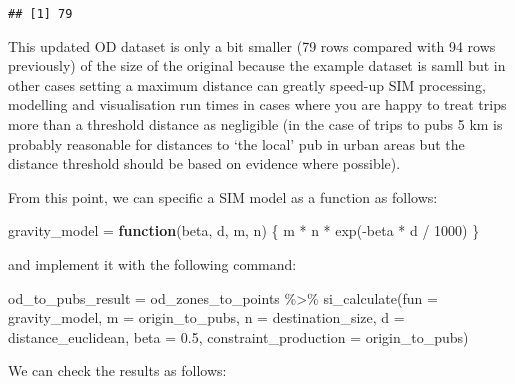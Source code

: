 \documentclass[11pt,letterpaper]{article}
\newenvironment{Shaded}{\begin{snugshade}}{\end{snugshade}}
\newcommand{\AttributeTok}[1]{\textcolor[rgb]{0.77,0.63,0.00}{#1}}
\newcommand{\ControlFlowTok}[1]{\textcolor[rgb]{0.13,0.29,0.53}{\textbf{#1}}}
\newcommand{\DecValTok}[1]{\textcolor[rgb]{0.00,0.00,0.81}{#1}}
\newcommand{\FloatTok}[1]{\textcolor[rgb]{0.00,0.00,0.81}{#1}}
\newcommand{\FunctionTok}[1]{\textcolor[rgb]{0.00,0.00,0.00}{#1}}
\newcommand{\NormalTok}[1]{#1}
\newcommand{\OtherTok}[1]{\textcolor[rgb]{0.56,0.35,0.01}{#1}}
\newcommand{\SpecialCharTok}[1]{\textcolor[rgb]{0.00,0.00,0.00}{#1}}
\begin{document}
\begin{verbatim}
## [1] 79
\end{verbatim}

This updated OD dataset is only a bit smaller (79 rows compared with 94 rows previously) of the size of the original because the example dataset is samll but in other cases setting a maximum distance can greatly speed-up SIM processing, modelling and visualisation run times in cases where you are happy to treat trips more than a threshold distance as negligible (in the case of trips to pubs 5 km is probably reasonable for distances to `the local' pub in urban areas but the distance threshold should be based on evidence where possible).

From this point, we can specific a SIM model as a function as follows:

\begin{Shaded}
\begin{Highlighting}[]
\NormalTok{gravity\_model }\OtherTok{=} \ControlFlowTok{function}\NormalTok{(beta, d, m, n) \{}
\NormalTok{  m }\SpecialCharTok{*}\NormalTok{ n }\SpecialCharTok{*} \FunctionTok{exp}\NormalTok{(}\SpecialCharTok{{-}}\NormalTok{beta }\SpecialCharTok{*}\NormalTok{ d }\SpecialCharTok{/} \DecValTok{1000}\NormalTok{)}
\NormalTok{\} }
\end{Highlighting}
\end{Shaded}

and implement it with the following command:

\begin{Shaded}
\begin{Highlighting}[]
\NormalTok{od\_to\_pubs\_result }\OtherTok{=}\NormalTok{ od\_zones\_to\_points }\SpecialCharTok{\%\textgreater{}\%} 
  \FunctionTok{si\_calculate}\NormalTok{(}\AttributeTok{fun =}\NormalTok{ gravity\_model, }
               \AttributeTok{m =}\NormalTok{ origin\_to\_pubs,}
               \AttributeTok{n =}\NormalTok{ destination\_size,}
               \AttributeTok{d =}\NormalTok{ distance\_euclidean,}
               \AttributeTok{beta =} \FloatTok{0.5}\NormalTok{,}
               \AttributeTok{constraint\_production =}\NormalTok{ origin\_to\_pubs)}
\end{Highlighting}
\end{Shaded}

We can check the results as follows:

\begin{Shaded}
\end{Shaded}
\end{document}
